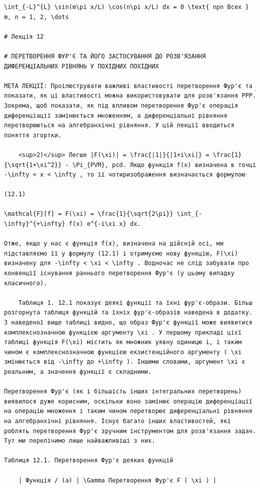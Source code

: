 \documentclass[
  ukrainian,
]{article}
\begin{document}
\begin{verbatim}
\int_{-L}^{L} \sin(m\pi x/L) \cos(n\pi x/L) dx = 0 \text{ npn Bcex } m, n = 1, 2, \dots

# Лекція 12

# ПЕРЕТВОРЕННЯ ФУР'Є ТА ЙОГО ЗАСТОСУВАННЯ ДО РОЗВ'ЯЗАННЯ ДИФЕРЕНЦІАЛЬНИХ РІВНЯНЬ У ПОХІДНИХ ПОХІДНИХ

МЕТА ЛЕКЦІЇ: Проілюструвати важливі властивості перетворення Фур'є та показати, як ці властивості можна використовувати для розв'язання PPP. Зокрема, щоб показати, як під впливом перетворення Фур'є операція диференціації замінюється множенням, а диференціальні рівняння перетворюються на алгебранхічні рівняння. У цій лекції вводиться поняття згортки.

    <sup>2)</sup> Легше |F(\xi)| = \frac{|1|}{|1+i\xi|} = \frac{1}{\sqrt{1+\xi^2}} - \Pi_{PVM}, pcd. Якщо функція f(x) визначена в точці -\infty < x < \infty , то її чотиризображення визначається формулою

(12.1)

\mathcal{F}[f] = F(\xi) = \frac{1}{\sqrt{2\pi}} \int_{-\infty}^{+\infty} f(x) e^{-i\xi x} dx.

Отже, якщо у нас є функція f(x), визначена на дійсній осі, ми підставляємо її у формулу (12.1) і отримуємо нову функцію, F(\xi) визначену для -\infty < \xi < \infty . Водночас не слід забувати про конвенції існування раннього перетворення Фур'є (у цьому випадку класичного).

    Таблиця 1. 12.1 показує деякі функції та їхні фур'є-образи. Більш розгорнута таблиця функцій та їхніх фур'є-образів наведена в додатку. З наведеної вище таблиці видно, що образ Фур'є функції може виявитися комплекснозначною функцією аргументу \xi . У першому прикладі цієї таблиці функція F(\xi) містить як множник уявну одиницю i, і таким чином є комплекснозначною функцією екзистенційного аргументу ( \xi змінюється від -\infty до +\infty ). Іншими словами, аргумент \xi є реальним, а значення функції є складними.

Перетворення Фур'є (як і більшість інших інтегральних перетворень) виявилося дуже корисним, оскільки воно замінює операцію диференціації на операцію множення і таким чином перетворює диференціальні рівняння на алгебранхічні рівняння. Існує багато інших властивостей, які роблять перетворення Фур'є зручним інструментом для розв'язання задач. Тут ми перелічимо лише найважливіші з них.

Таблиця 12.1. Перетворення Фур'є деяких функцій

    | Функція / (a) | \Gamma Перетворення Фур'є F ( \xi ) |


\end{verbatim}
\end{document}
